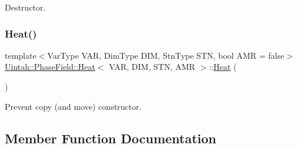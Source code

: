 Destructor. 

\mbox{\label{classUintah_1_1PhaseField_1_1Heat_a28cfb869ac32900e8f683abac43aa353}} 
\subsubsection{\texorpdfstring{Heat()}{Heat()}\hspace{0.1cm}{\footnotesize\ttfamily [2/2]}}
{\footnotesize\ttfamily template$<$Var\+Type V\+AR, Dim\+Type D\+IM, Stn\+Type S\+TN, bool A\+MR = false$>$ \\
\hyperlink{classUintah_1_1PhaseField_1_1Heat}{Uintah\+::\+Phase\+Field\+::\+Heat}$<$ V\+AR, D\+IM, S\+TN, A\+MR $>$\+::\hyperlink{classUintah_1_1PhaseField_1_1Heat}{Heat} (\begin{DoxyParamCaption}\item[{\hyperlink{classUintah_1_1PhaseField_1_1Heat}{Heat}$<$ V\+AR, D\+IM, S\+TN, A\+MR $>$ const \&}]{ }\end{DoxyParamCaption})\hspace{0.3cm}{\ttfamily [delete]}}



Prevent copy (and move) constructor. 



\subsection{Member Function Documentation}
\mbox{\label{classUintah_1_1PhaseField_1_1Heat_aeb00a7f9aec85898020c405a40c9dcb8}} 
